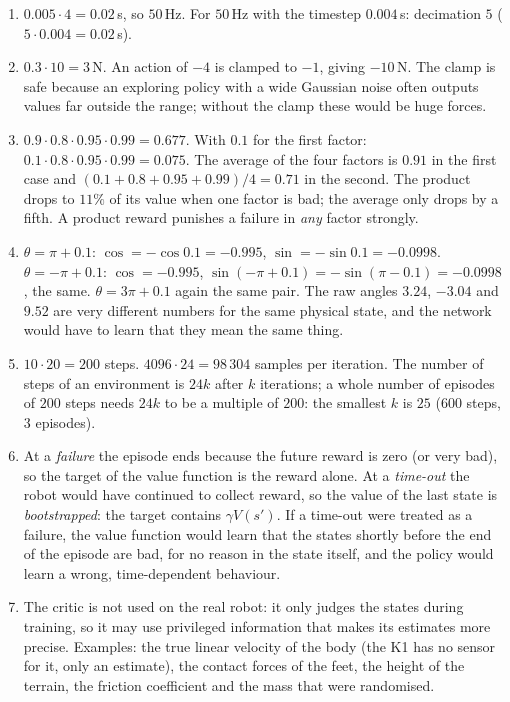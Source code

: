 \begin{enumerate}[label=\textbf{\ansnum.\arabic*}]
  \item $0.005\cdot4=0.02$\,s, so $50$\,Hz. For $50$\,Hz with the timestep $0.004$\,s: decimation $5$ ($5\cdot0.004=0.02$\,s).
  \item $0.3\cdot10=3$\,N. An action of $-4$ is clamped to $-1$, giving $-10$\,N. The clamp is safe because an exploring policy with a wide Gaussian noise often outputs values far outside the range; without the clamp these would be huge forces.
  \item $0.9\cdot0.8\cdot0.95\cdot0.99=0.677$. With $0.1$ for the first factor: $0.1\cdot0.8\cdot0.95\cdot0.99=0.075$. The average of the four factors is $0.91$ in the first case and $(0.1+0.8+0.95+0.99)/4=0.71$ in the second. The product drops to $11\%$ of its value when one factor is bad; the average only drops by a fifth. A product reward punishes a failure in \emph{any} factor strongly.
  \item $\theta=\pi+0.1$: $\cos=-\cos0.1=-0.995$, $\sin=-\sin0.1=-0.0998$. $\theta=-\pi+0.1$: $\cos=-0.995$, $\sin(-\pi+0.1)=-\sin(\pi-0.1)=-0.0998$, the same. $\theta=3\pi+0.1$ again the same pair. The raw angles $3.24$, $-3.04$ and $9.52$ are very different numbers for the same physical state, and the network would have to learn that they mean the same thing.
  \item $10\cdot20=200$ steps. $4096\cdot24=98\,304$ samples per iteration. The number of steps of an environment is $24k$ after $k$ iterations; a whole number of episodes of $200$ steps needs $24k$ to be a multiple of $200$: the smallest $k$ is $25$ ($600$ steps, $3$ episodes).
  \item At a \emph{failure} the episode ends because the future reward is zero (or very bad), so the target of the value function is the reward alone. At a \emph{time-out} the robot would have continued to collect reward, so the value of the last state is \emph{bootstrapped}: the target contains $\gamma V(s')$. If a time-out were treated as a failure, the value function would learn that the states shortly before the end of the episode are bad, for no reason in the state itself, and the policy would learn a wrong, time-dependent behaviour.
  \item The critic is not used on the real robot: it only judges the states during training, so it may use privileged information that makes its estimates more precise. Examples: the true linear velocity of the body (the K1 has no sensor for it, only an estimate), the contact forces of the feet, the height of the terrain, the friction coefficient and the mass that were randomised.

\end{enumerate}
